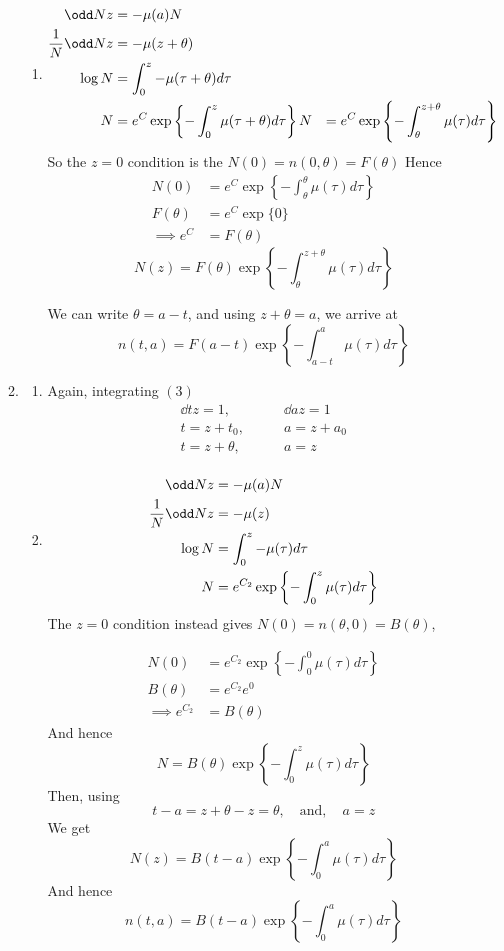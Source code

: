 \documentclass{X:/Documents/Coding/Latex/myassignment}
\begin{document}
\begin{enumerate}
\begin{enumerate}
\begin{enumerate}

			\item 
			\begin{align*}
				\odd Nz &= - \mu(a) N\\
				\frac1N \odd Nz &= - \mu(z+\theta)\\
				\log N &= \int_0^z -\mu(\tau+\theta) d \tau\\
				N &= e^{C} \exp\left\{-\int_0^z \mu(\tau+\theta) d \tau\right\}
				N &= e^{C} \exp\left\{-\int_\theta^{z+\theta} \mu(\tau) d \tau\right\}
			\end{align*}
			So the $z=0$ condition is the $N(0) = n(0,\theta) = F(\theta)$
			Hence
			\begin{align*}
				N(0) &= e^{C} \exp\left\{-\int_\theta^{\theta} \mu(\tau) d \tau\right\}\\
				F(\theta)&= e^C \exp\{0\}\\
				\implies e^C &= F(\theta)
			\end{align*}
			\[N(z) = F(\theta) \exp\left\{-\int_\theta^{z+\theta} \mu(\tau) d \tau\right\}\]

			We can write $\theta = a-t$, and using $z+\theta = a$, we arrive at
			\[n(t,a) = F(a-t) \exp\left\{-\int_{a-t}^a \mu(\tau) d \tau\right\}\]

		\end{enumerate}

		\item 
		\begin{enumerate}
			\item Again, integrating $(3)$
			\begin{align*}
				\dd tz = 1,& \qquad \dd az =1\\
				t = z + t_0,&\qquad a = z + a_0\\
				t = z + \theta,& \qquad a = z\\
			\end{align*}
			\item 
			\begin{align*}
				\odd Nz &= - \mu(a) N\\
				\frac1N \odd Nz &= - \mu(z)\\
				\log N &= \int_0^z -\mu(\tau) d \tau\\
				N &= e^{C_2} \exp\left\{-\int_0^{z} \mu(\tau) d \tau\right\}
			\end{align*}
			The $z=0$ condition instead gives $N(0) = n(\theta,0) = B(\theta)$, 

			\begin{align*}
				N(0) &= e^{C_2} \exp\left\{-\int_0^{0} \mu(\tau) d \tau\right\}\\
				B(\theta) &= e^{C_2} e^0\\
				\implies e^{C_2} &= B(\theta)
			\end{align*}
			And hence
			\[N = B(\theta) \exp\left\{-\int_0^{z} \mu(\tau) d \tau\right\}\]
			Then, using 
			\[t-a = z+\theta - z = \theta, \quad \text{and}, \quad a = z\]
			We get
			\[N(z) = B(t-a) \exp \left\{-\int_{0}^a \mu(\tau) d \tau\right\}\]
			And hence
			\[n(t,a) = B(t-a) \exp\left\{-\int_{0}^a \mu(\tau) d \tau\right\}\]


\end{enumerate}
\end{enumerate}
\end{enumerate}
\end{document}

